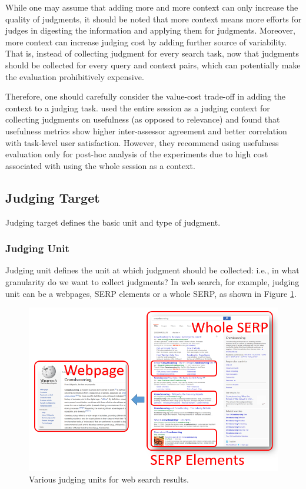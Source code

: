 \documentclass[openany]{now} %
\begin{document}
While one may assume that adding more and more context can only increase the quality of judgments, it should be noted that more context means more efforts for judges in digesting the information and applying them for judgments. Moreover, more context can increase judging cost by adding further source of variability. That is, instead of collecting judgment for every search task, now that judgments should be collected for every query and context pairs, which can potentially make the evaluation prohibitively expensive.

Therefore, one should carefully consider the value-cost trade-off in adding the context to a judging task. \cite{Mao:2016} used the entire session as a judging context for collecting judgments on usefulness (as opposed to relevance) and found that usefulness metrics show higher inter-assessor agreement and better correlation with task-level user satisfaction. However, they recommend using usefulness evaluation only for post-hoc analysis of the experiments due to high cost associated with using the whole session as a context.

\subsection{Judging Target}
Judging target defines the basic unit and type of judgment. 

\subsubsection{Judging Unit}
Judging unit defines the unit at which judgment should be collected: i.e., in what granularity do we want to collect judgments? In web search, for example, judging unit can be a webpages, SERP elements or a whole SERP, as shown in Figure \ref{fig:judging_units}. 

\begin{figure}
	\begin{center}
		\includegraphics[scale=0.5]{images/judging_units}
		\caption{Various judging units for web search results.} 
		\label{fig:judging_units}
	\end{center}
\end{figure}
\end{document}
